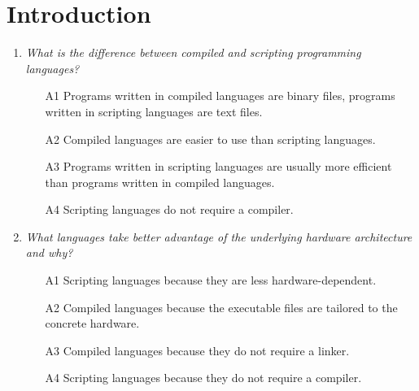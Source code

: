 
\setcounter{section}{0}
\section{Introduction}

\begin{enumerate}
\item {\em What is the difference between compiled and scripting programming languages?}\\

\begin{enumerate}
\item[A1] Programs written in compiled languages are binary files, programs written in 
          scripting languages are text files. 
\item[A2] Compiled languages are easier to use than scripting languages.
\item[A3] Programs written in scripting languages are usually more efficient than programs 
          written in compiled languages.
\item[A4] Scripting languages do not require a compiler.
\end{enumerate}
\vspace{4mm}

\item {\em What languages take better advantage of the underlying hardware architecture
      and why?}\\

\begin{enumerate}
\item[A1] Scripting languages because they are less hardware-dependent.
\item[A2] Compiled languages because the executable files are tailored 
          to the concrete hardware.
\item[A3] Compiled languages because they do not require a linker.
\item[A4] Scripting languages because they do not require a compiler.
\end{enumerate}
\vspace{4mm}


\end{enumerate}
